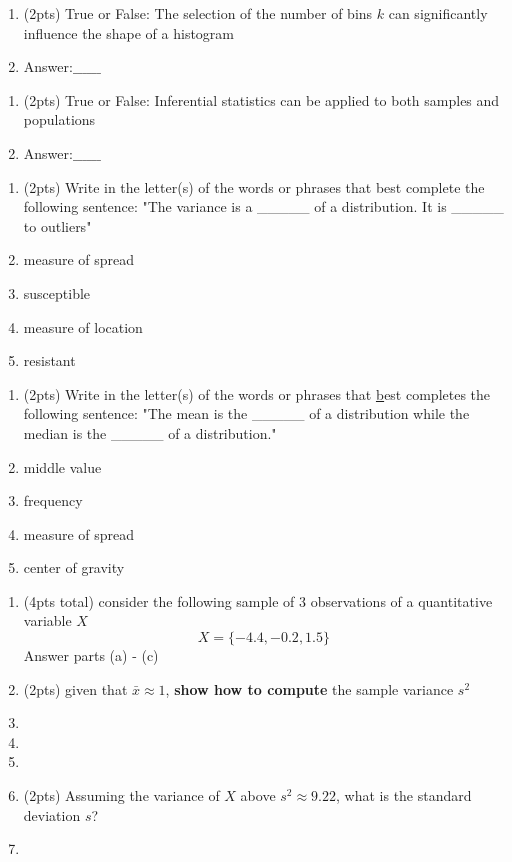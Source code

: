 \documentclass[
]{article}
\begin{document}
\begin{enumerate}
\item[\bf 4.)]{(2pts) True or False: The selection of the number of bins $k$ can significantly influence the shape of a histogram}
\item[] Answer:$\_\_\_\_\_\_$
\end{enumerate}

\begin{enumerate} 
  \item[\bf 5.)]{(2pts) True or False: Inferential statistics can be applied to both samples and populations}
  \item[] Answer:$\_\_\_\_\_\_$
\end{enumerate}

\begin{enumerate} 
  \item[\bf 6.)]{(2pts) Write in the letter(s) of the words or phrases that best complete the following sentence: "The variance is a \_\_\_\_\_ of a distribution. It is \_\_\_\_\_ to outliers"}
  \item[(a)] measure of spread
  \item[(b)] susceptible
  \item[(c)] measure of location
  \item[(d)] resistant
\end{enumerate}

\newpage
\begin{enumerate} 
  \item[\bf 7.)]{(2pts) Write in the letter(s) of the words or phrases that {\underline best completes} the following sentence: "The mean is the \_\_\_\_\_ of a distribution while the median is the \_\_\_\_\_ of a distribution."}
  \item[(a)] middle value
  \item[(b)] frequency
  \item[(c)] measure of spread
  \item[(d)] center of gravity
\end{enumerate}

\begin{enumerate}
\item[\bf 8.)]{ (4pts total) consider the following sample of 3 observations of a quantitative variable $X$ 
\[ X = \{-4.4, -0.2, 1.5\}\] Answer parts (a) - (c)}
\item[(a)] (2pts) given that $\bar{x} \approx 1$, \textbf{show how to compute} the sample variance $s^2$
\item[]
\item[]
\item[]
\item[(b)] (2pts) Assuming the variance of $X$ above $s^2 \approx 9.22$, what is the standard deviation $s$? 
\item[]
\end{enumerate}
\end{document}
